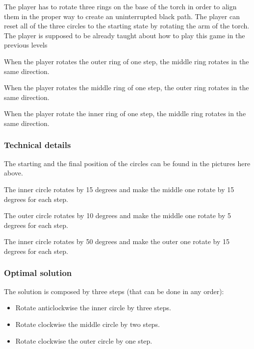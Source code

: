 

The player has to rotate three rings on the base of the torch in order to align them in the proper way to create an uninterrupted black path. The player can reset all of the three circles to the starting state by rotating the arm of the torch. The player is supposed to be already taught about how to play this game in the previous levels

When the player rotates the outer ring of one step, the middle ring rotates in the same direction.

When the player rotates the middle ring of one step, the outer ring rotates in the same direction.

When the player rotate the inner ring of one step, the middle ring rotates in the same direction.

\subsubsection*{Technical details}
The starting and the final position of the circles can be found in the pictures here above.

The inner circle rotates by 15 degrees and make the middle one rotate by 15 degrees for each step.

The outer circle rotates by 10 degrees and make the middle one rotate by 5 degrees for each step.

The inner circle rotates by 50 degrees and make the outer one rotate by 15 degrees for each step.


\subsubsection*{Optimal solution}
The solution is composed by three steps (that can be done in any order):

\begin{itemize}
	\item Rotate anticlockwise the inner circle by three steps.
	\item Rotate clockwise the middle circle by two steps.
	\item Rotate clockwise the outer circle by one step.
\end{itemize}

